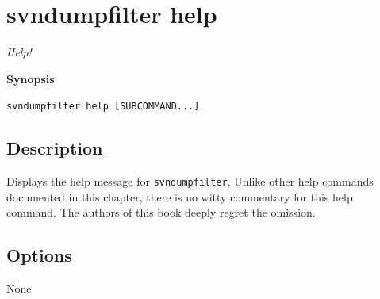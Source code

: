 \section{svndumpfilter
help}\label{svn.ref.svndumpfilter.commands.c.help}

\emph{Help!}

\textbf{Synopsis}

\texttt{svndumpfilter\ help\ {[}SUBCOMMAND...{]}}

\subsection{Description}

Displays the help message for \texttt{svndumpfilter}. Unlike other help
commands documented in this chapter, there is no witty commentary for
this help command. The authors of this book deeply regret the omission.

\subsection{Options}

None

